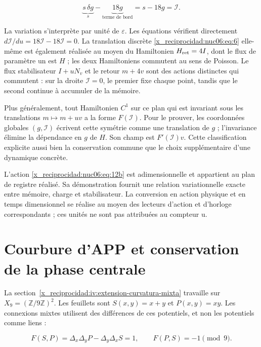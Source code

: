 \begin{equation}
\underbrace{s\,\delta g}_{s}
-\underbrace{18g}_{\text{terme de bord}}
=s-18g=\mathcal I.
\label{x_reciprocidad:nuc06:eq:12c}
\end{equation}

La variation s’interprète par unité de \(\varepsilon\). Les équations vérifient directement \(d\mathcal I/du=18\mathcal I-18\mathcal I=0\). La translation discrète \eqref{x_reciprocidad:nuc06:eq:6} elle-même est également réalisée au moyen du Hamiltonien \(H_{\rm ret}=4\mathcal I\), dont le flux de paramètre un est \(H\) ; les deux Hamiltoniens commutent au sens de Poisson. Le flux stabilisateur \(I+uN_v\) et le retour \(m+4v\) sont des actions distinctes qui commutent : sur la droite \(\mathcal I=0\), le premier fixe chaque point, tandis que le second continue à accumuler de la mémoire.

Plus généralement, tout Hamiltonien \(C^1\) sur ce plan qui est invariant sous les translations \(m\mapsto m+uv\) a la forme \(F(\mathcal I)\). Pour le prouver, les coordonnées globales \((g,\mathcal I)\) écrivent cette symétrie comme une translation de \(g\) ; l’invariance élimine la dépendance en \(g\) de \(H\). Son champ est \(F'(\mathcal I)v\). Cette classification explicite aussi bien la conservation commune que le choix supplémentaire d’une dynamique concrète.

L’action \eqref{x_reciprocidad:nuc06:eq:12b} est adimensionnelle et appartient au plan de registre réalisé. Sa démonstration fournit une relation variationnelle exacte entre mémoire, charge et stabilisateur. La conversion en action physique et en temps dimensionnel se réalise au moyen des lecteurs d’action et d’horloge correspondants ; ces unités ne sont pas attribuées au compteur u.

\section{Courbure d’APP et conservation de la phase centrale}

La section~\ref{x_reciprocidad:iv:extension-curvatura-mixta} travaille sur \(X_9=(\mathbb Z/9\mathbb Z)^2\). Les feuillets sont \(S(x,y)=x+y\) et \(P(x,y)=xy\). Les connexions mixtes utilisent des différences de ces potentiels, et non les potentiels comme liens :

\begin{equation}
F(S,P)=\Delta_x\Delta_yP-\Delta_y\Delta_xS=1,
\qquad F(P,S)=-1\pmod9.
\label{x_reciprocidad:nuc06:eq:13}
\end{equation}

